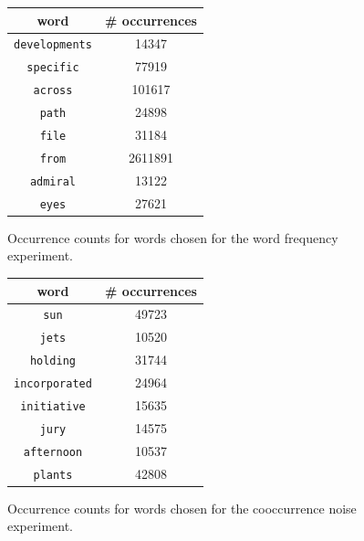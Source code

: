 \documentclass{article} %
\newcommand{\word}[1]{\texttt{#1}}
\begin{document}
\begin{figure}
\begin{center}
\begin{tabular}{c | c}
word & \# occurrences \\
\hline
\word{developments} & 14347 \\
\word{specific} & 77919 \\
\word{across} & 101617 \\
\word{path} & 24898 \\
\word{file} & 31184 \\
\word{from} & 2611891 \\
\word{admiral} & 13122 \\
\word{eyes} & 27621 \\
\end{tabular}
\end{center}
\label{fig:word-frequency-counts}
\caption{Occurrence counts for words chosen for the word frequency experiment. }
\end{figure}

\begin{figure}
\begin{center}
\begin{tabular}{c | c}
word & \# occurrences \\
\hline
\word{sun} & 49723 \\
\word{jets} & 10520 \\
\word{holding} & 31744 \\
\word{incorporated} & 24964 \\
\word{initiative} & 15635 \\
\word{jury} & 14575 \\
\word{afternoon} & 10537 \\
\word{plants} & 42808 \\
\end{tabular}
\end{center}
\label{fig:cooccurrence-noise-counts}
\caption{Occurrence counts for words chosen for the cooccurrence noise experiment. }
\end{figure}
\end{document}
